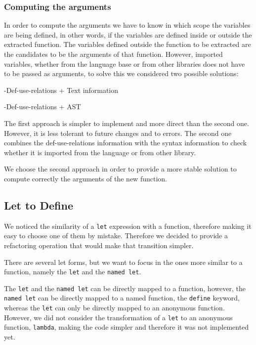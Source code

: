 \subsubsection{Computing the arguments}

In order to compute the arguments we have to know in which scope the variables are being defined, in other words,
if the variables are defined inside or outside the extracted function. %
The variables defined outside the function to be extracted are the candidates to be the arguments %
of that function.
However, imported variables, whether from the language base or from other libraries
does not have to be passed as arguments, to solve this we considered two possible solutions:

  -Def-use-relations + Text information

  -Def-use-relations + AST

The first approach is simpler to implement and more direct than the second one.
However, it is less tolerant to future changes and to errors.
The second one combines the def-use-relations information with the syntax information to
check whether it is imported from the language or from other library.

We choose the second approach in order to provide a more stable solution to compute
 correctly the arguments of the new function.

\subsection{Let to Define} %

We noticed the similarity of a {\tt let} expression with a function, therefore making
it easy to choose one of them by mistake.
Therefore we decided to provide a refactoring operation that would make that transition simpler.

There are several let forms, but we want to focus in the ones more similar to
a function, namely the {\tt let} and the {\tt named let}.

The {\tt let} and the {\tt named let} can be directly mapped to a function, however, the {\tt named let}
 can be directly mapped to a named function, the {\tt define} keyword, whereas the {\tt let} can only be directly mapped
to an anonymous function.
However, we did not consider the transformation of a {\tt let} to an anonymous function, {\tt lambda},
making the code simpler and therefore it was not implemented yet.\\


